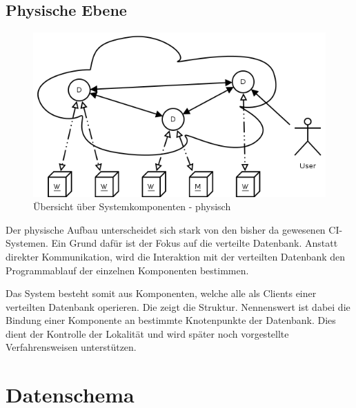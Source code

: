 

\subsection{Physische Ebene}

\begin{figure}[ht] 
  \centering
  \includegraphics[width=\textwidth]{imageinput/grob-layout-komponenten.png}
  \caption{Übersicht über Systemkomponenten - physisch}
  \label{fig:grob-layout-komponenten}
\end{figure}

Der physische Aufbau unterscheidet sich stark von den bisher da gewesenen CI-Systemen.
Ein Grund dafür ist der Fokus auf die verteilte Datenbank.
Anstatt direkter Kommunikation,
wird die Interaktion mit der verteilten Datenbank den Programmablauf der einzelnen Komponenten bestimmen.

Das System besteht somit aus Komponenten, welche alle als Clients einer verteilten Datenbank operieren.
Die  zeigt die Struktur.
Nennenswert ist dabei die Bindung einer Komponente an bestimmte Knotenpunkte der Datenbank. Dies dient der Kontrolle der Lokalität und wird später noch vorgestellte Verfahrensweisen unterstützen.


\section{Datenschema}
\label{sec:design:schema}

